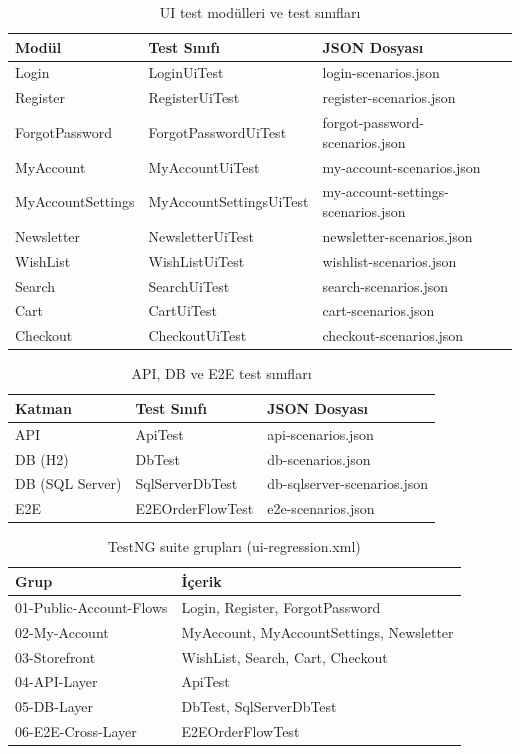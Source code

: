 \begin{table}[H]
  \centering
  \caption{UI test modülleri ve test sınıfları}
  \begin{tabular}{@{}lll@{}}
    \toprule
    \textbf{Modül} & \textbf{Test Sınıfı} & \textbf{JSON Dosyası} \\
    \midrule
    Login & LoginUiTest & login-scenarios.json \\
    Register & RegisterUiTest & register-scenarios.json \\
    ForgotPassword & ForgotPasswordUiTest & forgot-password-scenarios.json \\
    MyAccount & MyAccountUiTest & my-account-scenarios.json \\
    MyAccountSettings & MyAccountSettingsUiTest & my-account-settings-scenarios.json \\
    Newsletter & NewsletterUiTest & newsletter-scenarios.json \\
    WishList & WishListUiTest & wishlist-scenarios.json \\
    Search & SearchUiTest & search-scenarios.json \\
    Cart & CartUiTest & cart-scenarios.json \\
    Checkout & CheckoutUiTest & checkout-scenarios.json \\
    \bottomrule
  \end{tabular}
\end{table}

\begin{table}[H]
  \centering
  \caption{API, DB ve E2E test sınıfları}
  \begin{tabular}{@{}lll@{}}
    \toprule
    \textbf{Katman} & \textbf{Test Sınıfı} & \textbf{JSON Dosyası} \\
    \midrule
    API & ApiTest & api-scenarios.json \\
    DB (H2) & DbTest & db-scenarios.json \\
    DB (SQL Server) & SqlServerDbTest & db-sqlserver-scenarios.json \\
    E2E & E2EOrderFlowTest & e2e-scenarios.json \\
    \bottomrule
  \end{tabular}
\end{table}

\begin{table}[H]
  \centering
  \caption{TestNG suite grupları (ui-regression.xml)}
  \begin{tabular}{@{}ll@{}}
    \toprule
    \textbf{Grup} & \textbf{İçerik} \\
    \midrule
    01-Public-Account-Flows & Login, Register, ForgotPassword \\
    02-My-Account & MyAccount, MyAccountSettings, Newsletter \\
    03-Storefront & WishList, Search, Cart, Checkout \\
    04-API-Layer & ApiTest \\
    05-DB-Layer & DbTest, SqlServerDbTest \\
    06-E2E-Cross-Layer & E2EOrderFlowTest \\
    \bottomrule
  \end{tabular}
\end{table}
